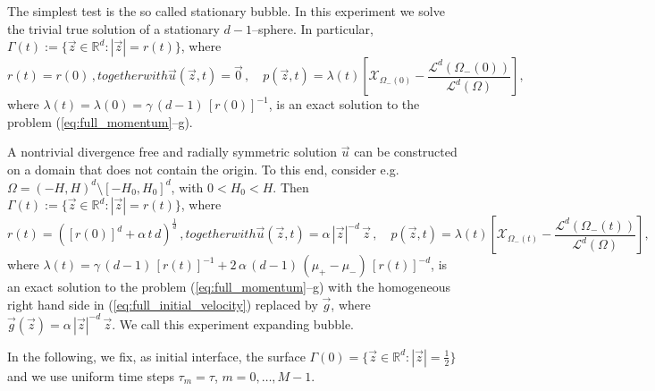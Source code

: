 \documentclass[a4paper,12pt,onecolumn]{article}
\newcommand{\R}{{\mathbb R}}
\newcommand{\bigchi}{\ensuremath{\mathrm{\mathcal{X}}}}
\newcommand{\charfcn}[1]{\bigchi_{#1}} %
\begin{document}
The simplest test is the so called stationary bubble. In this experiment we
solve the trivial true solution of a stationary $d-1$--sphere. In particular,
$\Gamma(t) := \{ \vec z \in \R^d : |\vec z| = r(t)\}$, where
\begin{subequations}
\begin{equation} \label{eq:radialr}
r(t) = r(0)\,,
\end{equation}
together with
\begin{equation} \label{eq:radialup}
\vec u(\vec z, t) = \vec 0 \,,\quad p(\vec z, t) =
\lambda(t)\left[\charfcn{\Omega_-(0)}
-\frac{\mathcal{L}^d(\Omega_-(0))}{\mathcal{L}^d(\Omega)} \right] ,
\end{equation}
\end{subequations}
where $\lambda(t) = \lambda(0) = \gamma\,(d-1)\,[r(0)]^{-1}$, is an exact
solution to the problem (\ref{eq:full_momentum}--g).

A nontrivial divergence free and radially symmetric solution $\vec u$ can be
constructed on a domain that does not contain the origin. To this end, consider
e.g.\ $\Omega = (-H,H)^d \setminus [-H_0, H_0]^d$, with $0 < H_0 < H$. Then
$\Gamma(t) := \{ \vec z \in \R^d : |\vec z| = r(t)\}$, where
\begin{subequations}
\begin{equation} \label{eq:radialr2}
r(t) = ([r(0)]^d + \alpha\,t\,d)^\frac1d \,,
\end{equation}
together with
\begin{equation} \label{eq:radialup2}
\vec u(\vec z, t) = \alpha\,|\vec z|^{-d}\,\vec z \,, \quad p(\vec z, t) =
\lambda(t)\left[ \charfcn{\Omega_-(t)} -
\frac{\mathcal{L}^d(\Omega_-(t))}{\mathcal{L}^d(\Omega)}\right],
\end{equation}
\end{subequations}
where $\lambda(t) = \gamma\,(d-1)\,[r(t)]^{-1} + 2\,\alpha\,(d-1)\,(\mu_+ -
\mu_-)\,[r(t)]^{-d}$, is an exact solution to the problem
(\ref{eq:full_momentum}--g) with the homogeneous right hand side in
(\ref{eq:full_initial_velocity}) replaced by $\vec g$, where $\vec g(\vec z) =
\alpha\,|\vec z|^{-d}\,\vec z$. We call this experiment expanding bubble.

In the following, we fix, as initial interface, the surface $\Gamma(0) = \{
\vec z \in \R^d : |\vec z| = \frac12 \}$ and we use uniform time steps
$\tau_m=\tau$, $m=0,\ldots, M-1$.
\end{document}
